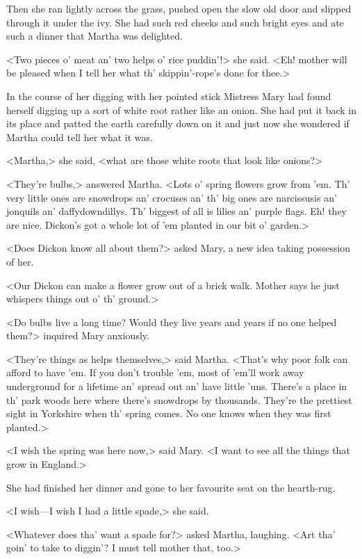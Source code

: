 Then she ran lightly across the grass, pushed open the slow old door and slipped through it under the ivy. She had such red cheeks and such bright eyes and ate such a dinner that Martha was delighted.

<Two pieces o' meat an' two helps o' rice puddin'!> she said. <Eh! mother will be pleased when I tell her what th' skippin'-rope's done for thee.>

In the course of her digging with her pointed stick Mistress Mary had found herself digging up a sort of white root rather like an onion. She had put it back in its place and patted the earth carefully down on it and just now she wondered if Martha could tell her what it was.

<Martha,> she said, <what are those white roots that look like onions?>

<They're bulbs,> answered Martha. <Lots o' spring flowers grow from 'em. Th' very little ones are snowdrops an' crocuses an' th' big ones are narcissusis an' jonquils an' daffydowndillys. Th' biggest of all is lilies an' purple flags. Eh! they are nice. Dickon's got a whole lot of 'em planted in our bit o' garden.>

<Does Dickon know all about them?> asked Mary, a new idea taking possession of her.

<Our Dickon can make a flower grow out of a brick walk. Mother says he just whispers things out o' th' ground.>

<Do bulbs live a long time? Would they live years and years if no one helped them?> inquired Mary anxiously.

<They're things as helps themselves,> said Martha. <That's why poor folk can afford to have 'em. If you don't trouble 'em, most of 'em'll work away underground for a lifetime an' spread out an' have little 'uns. There's a place in th' park woods here where there's snowdrops by thousands. They're the prettiest sight in Yorkshire when th' spring comes. No one knows when they was first planted.>

<I wish the spring was here now,> said Mary. <I want to see all the things that grow in England.>

She had finished her dinner and gone to her favourite seat on the hearth-rug.

<I wish—I wish I had a little spade,> she said.

<Whatever does tha' want a spade for?> asked Martha, laughing. <Art tha' goin' to take to diggin'? I must tell mother that, too.>

